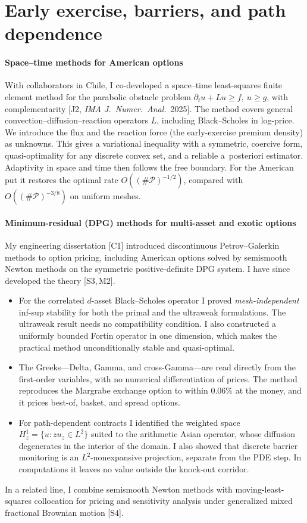 \documentclass[11pt]{article}
\newcommand{\rc}[1]{\textcolor{accent}{[#1]}}
\begin{document}
\section{Early exercise, barriers, and path dependence}

\paragraph{Space--time methods for American options}
With collaborators in Chile, I co-developed a space--time least-squares
finite element method for the parabolic obstacle problem
$\partial_t u+Lu\ge f,\ u\ge g$, with complementarity \rc{J2,
\emph{IMA J.\ Numer.\ Anal.}\ 2025}. The method covers general
convection--diffusion--reaction operators $L$, including Black--Scholes in
log-price. We introduce the flux and the reaction force (the
early-exercise premium density) as unknowns. This gives a variational
inequality with a symmetric, coercive form, quasi-optimality for any
discrete convex set, and a reliable a~posteriori estimator. Adaptivity in
space and time then follows the free boundary. For the American put it
restores the optimal rate $O((\#\mathcal P)^{-1/2})$, compared with
$O((\#\mathcal P)^{-3/8})$ on uniform meshes.

\paragraph{Minimum-residual (DPG) methods for multi-asset and exotic options}
My engineering dissertation \rc{C1} introduced discontinuous
Petrov--Galerkin methods to option pricing, including American options
solved by semismooth Newton methods on the symmetric positive-definite DPG
system. I have since developed the theory \rc{S3,\,M2}.
\begin{itemize}
\item For the correlated $d$-asset Black--Scholes operator I proved
      \emph{mesh-independent} inf-sup stability for both the primal and
      the ultraweak formulations. The ultraweak result needs no
      compatibility condition. I also constructed a uniformly bounded
      Fortin operator in one dimension, which makes the practical method
      unconditionally stable and quasi-optimal.
\item The Greeks---Delta, Gamma, and cross-Gamma---are read directly from
      the first-order variables, with no numerical differentiation of
      prices. The method reproduces the Margrabe exchange option to within
      0.06\% at the money, and it prices best-of, basket, and spread
      options.
\item For path-dependent contracts I identified the weighted space
      $H^1_z=\{u: zu_z\in L^2\}$ suited to the arithmetic Asian operator,
      whose diffusion degenerates in the interior of the domain. I also
      showed that discrete barrier monitoring is an $L^2$-nonexpansive
      projection, separate from the PDE step. In computations it leaves no
      value outside the knock-out corridor.
\end{itemize}
In a related line, I combine semismooth Newton methods with moving-least-squares
collocation for pricing and sensitivity analysis under generalized mixed
fractional Brownian motion \rc{S4}.
\end{document}
